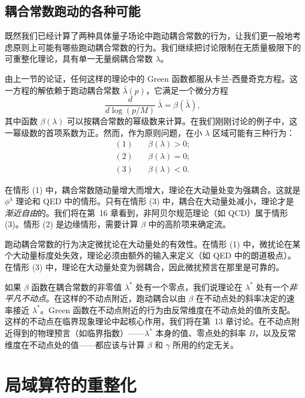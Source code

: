 \subsection{耦合常数跑动的各种可能}

既然我们已经计算了两种具体量子场论中跑动耦合常数的行为，让我们更一般地考虑原则上可能有哪些跑动耦合常数的行为。我们继续把讨论限制在无质量极限下的可重整化理论，具有单一无量纲耦合常数 $\lambda$。

由上一节的论证，任何这样的理论中的 Green 函数都服从卡兰-西曼奇克方程。这一方程的解依赖于跑动耦合常数 $\bar{\lambda}(p)$，它满足一个微分方程
\begin{equation}
  \frac{d}{d\log(p/M)}\ \bar{\lambda} = \beta(\bar{\lambda}),
  \label{eq:12.90}
\end{equation}
其中函数 $\beta(\lambda)$ 可以按耦合常数的幂级数来计算。在我们刚刚讨论的例子中，这一幂级数的首项系数为正。然而，作为原则问题，在小 $\lambda$ 区域可能有三种行为：
\begin{equation}
  \begin{aligned}
    (1)\quad &\beta(\lambda) > 0;\\
    (2)\quad &\beta(\lambda) = 0;\\
    (3)\quad &\beta(\lambda) < 0 .
  \end{aligned}
\end{equation}

在情形 (1) 中，耦合常数随动量增大而增大，理论在大动量处变为强耦合。这就是 $\phi^4$ 理论和 QED 中的情形。只有在情形 (3) 中，耦合在大动量处减小，理论才是\emph{渐近自由}的。我们将在第~16 章看到，非阿贝尔规范理论（如 QCD）属于情形 (3)。情形 (2) 是边缘情形，需要计算 $\beta$ 中的高阶项来确定流。

跑动耦合常数的行为决定微扰论在大动量处的有效性。在情形 (1) 中，微扰论在某个大动量标度处失效，理论必须由额外的输入来定义（如 QED 中的朗道极点）。在情形 (3) 中，理论在大动量处变为弱耦合，因此微扰预言在那里是可靠的。

如果 $\beta$ 函数在耦合常数的非零值 $\lambda^{*}$ 处有一个零点，我们说理论在 $\lambda^{*}$ 处有一个\emph{非平凡不动点}。在这样的不动点附近，跑动耦合以由 $\beta$ 在不动点处的斜率决定的速率接近 $\lambda^{*}$。Green 函数在不动点附近的行为由反常维度在不动点处的值所支配。这样的不动点在临界现象理论中起核心作用，我们将在第~13 章讨论。在不动点附近得到的物理预言（如临界指数）——$\lambda^{*}$ 本身的值、零点处的斜率 $B$，以及反常维度在不动点处的值——都应该与计算 $\beta$ 和 $\gamma$ 所用的约定无关。

\section{局域算符的重整化}

